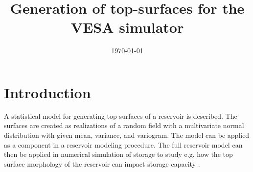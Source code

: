 \documentclass[11pt,a4paper]{amsart}
\begin{document}
\title{Generation of top-surfaces for the VESA simulator}
\date{\today}
\maketitle
\section{Introduction}
\label{sec:introduction}
A statistical model for generating top surfaces of a
reservoir is described. The surfaces are created as realizations of a random field with
a multivariate normal distribution with given mean, variance, and  
variogram. The model can be applied as a component in a reservoir modeling
procedure. The full reservoir model can then be applied in numerical
simulation of \cotwo{}  
storage to study e.g. how the top surface morphology of the
reservoir can impact storage 
capacity \cite{nil12:imp}. 
\end{document}
